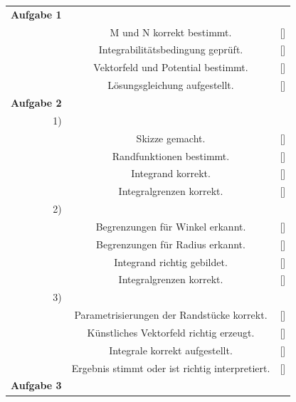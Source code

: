 \documentclass[11pt,final]{scrreprt}
\begin{document}
\begin{tabular}{rcl}
\textbf{Aufgabe 1} &  &  \\  
 & M und N korrekt bestimmt. & [\hspace*{0.3cm}] \\ 
 & Integrabilitätsbedingung geprüft. & [\hspace*{0.3cm}] \\ 
 & Vektorfeld und Potential bestimmt. & [\hspace*{0.3cm}] \\ 
 & Lösungsgleichung aufgestellt. & [\hspace*{0.3cm}] \\ 
\textbf{Aufgabe 2} &  &  \\
1) &  &  \\
 & Skizze gemacht.& [\hspace*{0.3cm}] \\ 
 & Randfunktionen bestimmt. & [\hspace*{0.3cm}] \\ 
 & Integrand korrekt. & [\hspace*{0.3cm}] \\ 
 & Integralgrenzen korrekt. & [\hspace*{0.3cm}] \\ 
2) &  &  \\
 & Begrenzungen für Winkel erkannt. & [\hspace*{0.3cm}] \\ 
 & Begrenzungen für Radius erkannt. & [\hspace*{0.3cm}] \\ 
 & Integrand richtig gebildet. & [\hspace*{0.3cm}] \\ 
 & Integralgrenzen korrekt. & [\hspace*{0.3cm}] \\ 
3) &  &  \\
 & Parametrisierungen der Randstücke korrekt. & [\hspace*{0.3cm}] \\ 
 & Künstliches Vektorfeld richtig erzeugt. & [\hspace*{0.3cm}] \\ 
 & Integrale korrekt aufgestellt. & [\hspace*{0.3cm}] \\ 
 & Ergebnis stimmt oder ist richtig interpretiert. & [\hspace*{0.3cm}] \\ 
\textbf{Aufgabe 3} &  &  \\

\end{tabular}
\end{document}
